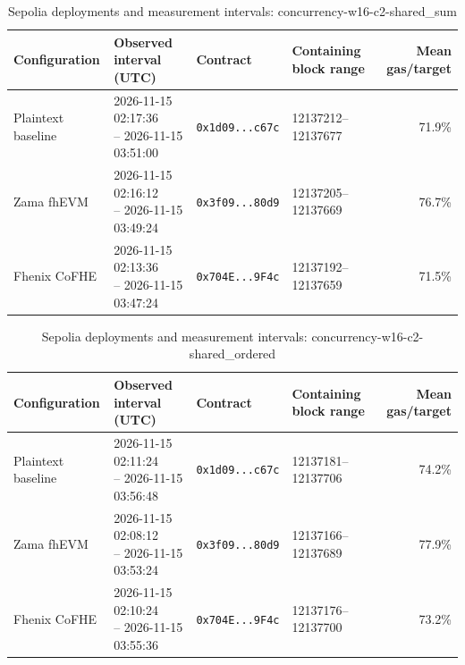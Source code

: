 \begin{table}[!t]
\caption{Sepolia deployments and measurement intervals: concurrency-w16-c2-shared\_sum}
\label{tab:sepolia-concurrency-w16-c2-shared-sum}
\centering
\footnotesize
\setlength{\tabcolsep}{4pt}
\begin{tabular}{|l|l|l|l|r|}
\hline
\textbf{Configuration} & \textbf{Observed interval (UTC)} & \textbf{Contract} & \textbf{Containing block range} & \textbf{Mean gas/target} \\
\hline
Plaintext baseline & \shortstack[l]{2026-11-15 02:17:36 \\ -- 2026-11-15 03:51:00} & \texttt{0x1d09...c67c} & 12137212--12137677 & 71.9\% \\
\hline
Zama fhEVM & \shortstack[l]{2026-11-15 02:16:12 \\ -- 2026-11-15 03:49:24} & \texttt{0x3f09...80d9} & 12137205--12137669 & 76.7\% \\
\hline
Fhenix CoFHE & \shortstack[l]{2026-11-15 02:13:36 \\ -- 2026-11-15 03:47:24} & \texttt{0x704E...9F4c} & 12137192--12137659 & 71.5\% \\
\hline
\end{tabular}
\end{table}

\begin{table}[!t]
\caption{Sepolia deployments and measurement intervals: concurrency-w16-c2-shared\_ordered}
\label{tab:sepolia-concurrency-w16-c2-shared-ordered}
\centering
\footnotesize
\setlength{\tabcolsep}{4pt}
\begin{tabular}{|l|l|l|l|r|}
\hline
\textbf{Configuration} & \textbf{Observed interval (UTC)} & \textbf{Contract} & \textbf{Containing block range} & \textbf{Mean gas/target} \\
\hline
Plaintext baseline & \shortstack[l]{2026-11-15 02:11:24 \\ -- 2026-11-15 03:56:48} & \texttt{0x1d09...c67c} & 12137181--12137706 & 74.2\% \\
\hline
Zama fhEVM & \shortstack[l]{2026-11-15 02:08:12 \\ -- 2026-11-15 03:53:24} & \texttt{0x3f09...80d9} & 12137166--12137689 & 77.9\% \\
\hline
Fhenix CoFHE & \shortstack[l]{2026-11-15 02:10:24 \\ -- 2026-11-15 03:55:36} & \texttt{0x704E...9F4c} & 12137176--12137700 & 73.2\% \\
\hline
\end{tabular}
\end{table}
